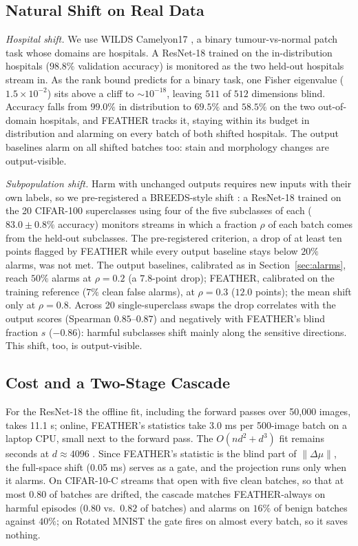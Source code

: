 \documentclass[conference]{IEEEtran}
\begin{document}
\subsection{Natural Shift on Real Data}
\label{sec:wilds}

\textit{Hospital shift.} We use WILDS Camelyon17 \cite{koh2021wilds}, a binary
tumour-vs-normal patch task whose domains are hospitals. A ResNet-18 trained on
the in-distribution hospitals ($98.8\%$ validation accuracy) is monitored as
the two held-out hospitals stream in. As the rank bound predicts for a binary
task, one Fisher eigenvalue ($1.5\times10^{-2}$) sits above a cliff to
$\sim10^{-18}$, leaving $511$ of $512$ dimensions blind. Accuracy falls from
$99.0\%$ in distribution to $69.5\%$ and $58.5\%$ on the two out-of-domain
hospitals, and FEATHER tracks it, staying within its budget in distribution
and alarming on every batch of both shifted hospitals. The output baselines
alarm on all shifted batches too: stain and morphology changes are
output-visible.

\textit{Subpopulation shift.} Harm with unchanged outputs requires new inputs
with their own labels, so we pre-registered a BREEDS-style shift
\cite{santurkar2021breeds}: a ResNet-18 trained on the 20 CIFAR-100
superclasses using four of the five subclasses of each ($83.0 \pm 0.8\%$
accuracy) monitors streams in which a fraction $\rho$ of each batch comes from
the held-out subclasses. The pre-registered criterion, a drop of at least ten
points flagged by FEATHER while every output baseline stays below $20\%$
alarms, was not met. The output baselines, calibrated as in
Section~\ref{sec:alarms}, reach $50\%$ alarms at $\rho = 0.2$ (a $7.8$-point
drop); FEATHER, calibrated on the training reference ($7\%$ clean false
alarms), at $\rho = 0.3$ ($12.0$ points); the mean shift only at $\rho = 0.8$.
Across 20 single-superclass swaps the drop correlates with the output scores
(Spearman $0.85$--$0.87$) and negatively with FEATHER's blind fraction $s$
($-0.86$): harmful subclasses shift mainly along the sensitive directions. This
shift, too, is output-visible.

\subsection{Cost and a Two-Stage Cascade}
\label{sec:cascade}

For the ResNet-18 the offline fit, including the forward passes over
50{,}000 images, takes 11.1 s; online, FEATHER's statistics take 3.0 ms per
500-image batch on a laptop CPU, small next to the forward pass. The
$O(nd^2 + d^3)$ fit remains seconds at $d \approx 4096$
\cite{halko2011structure}. Since FEATHER's statistic is the blind part of
$\lVert\Delta\mu\rVert$, the full-space shift (0.05 ms) serves as a gate, and
the projection runs only when it alarms. On CIFAR-10-C streams that open with five clean batches, so that at
most $0.80$ of batches are drifted, the cascade matches
FEATHER-always on harmful episodes ($0.80$ vs.\ $0.82$ of batches) and alarms
on $16\%$ of benign batches against $40\%$; on Rotated MNIST the gate fires on
almost every batch, so it saves nothing.
\end{document}
